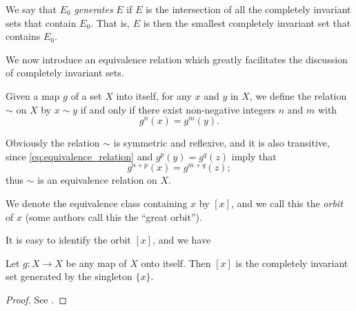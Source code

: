 \begin{definition}
    We say that $E_0$ \emph{generates} $E$ if $E$ is the intersection of all the
    completely invariant sets that contain $E_0$. That is, $E$ is then the
    smallest completely invariant set that contains $E_0$.
\end{definition}

We now introduce an equivalence relation which greatly facilitates the
discussion of completely invariant sets.

\begin{definition}
    Given a map $g$ of a set $X$ into itself, for any $x$ and $y$ in $X$, we
    define the relation $\sim$ on $X$ by $x \sim y$ if and only if there exist
    non-negative integers $n$ and $m$ with
    \begin{equation}
        \label{eq:equivalence_relation}
        g^n(x) = g^m(y).
    \end{equation}
\end{definition}

\begin{remark}
    Obviously the relation $\sim$ is symmetric and reflexive, and it is also
    transitive, since \eqref{eq:equivalence_relation} and $g^p(y) = g^q(z)$
    imply that
    \begin{equation*}
        g^{n+p}(x) = g^{m+q}(z);
    \end{equation*}
    thus $\sim$ is an equivalence relation on $X$.
\end{remark}

\begin{definition}
    We denote the equivalence class containing $x$ by $[x]$, and we call this
    the \emph{orbit} of $x$ (some authors call this the \enquote{great orbit}).
\end{definition}

It is easy to identify the orbit $[x]$, and we have

\begin{theorem}
    Let $g: X \to X$ be any map of $X$ onto itself. Then $[x]$ is the completely
    invariant set generated by the singleton $\{x\}$.
\end{theorem}
\begin{proof}
    See \cite[53]{Beardon1991}.
\end{proof}

